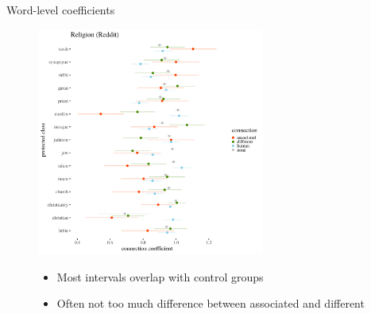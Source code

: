 \documentclass[
  10pt,
  ignorenonframetext,
  x11names, dvipsnames, bibspacing,natbib]{beamer}
\begin{document}
\begin{frame}{Word-level coefficients}
\protect\hypertarget{word-level-coefficients}{}
\begin{figure}[!htb]\centering
  \begin{minipage}{0.55\textwidth}
\includegraphics[width=7.5cm]{../../images/visReligionReddit.png}
\end{minipage}
\begin{minipage}{0.4\textwidth}\footnotesize

\vspace{-4cm}

   \begin{itemize}
   \item Most intervals overlap with control groups
   \item Often not too much difference between associated and different
   \end{itemize}
   \end{minipage}
\end{figure}
\end{frame}
\end{document}
